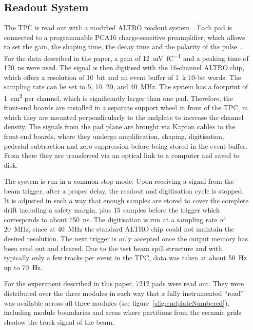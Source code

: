 \documentclass[preprint]{elsarticle}
\begin{document}
\subsection{Readout System}
The TPC is read out with a modified ALTRO readout system~\cite{ALTROchip,altro:eudet08}. Each pad is connected to a programmable PCA16 charge-sensitive preamplifier, which allows to set the gain, the shaping time, the decay time and the polarity of the pulse~\cite{EudetPCA16,ShiMaster}. For the data described in the paper, a gain of \SI[per-mode=symbol]{12}{\mV \per \femto\coulomb} and a peaking time of \SI{120}{\ns} were used. The signal is then digitised with the 16-channel ALTRO chip, which offers a resolution of 10~bit and an event buffer of \SI{1}{k} 10-bit words. The sampling rate can be set to 5, 10, 20, and \SI{40}{\MHz}. The system has a footprint of \SI{1}{\square\cm} per channel, which is significantly larger than one pad. Therefore, the front-end boards are installed in a separate support wheel in front of the TPC, in which they are mounted perpendicularly to the endplate to increase the channel density. The signals from the pad plane are brought via Kapton cables 
to the front-end boards, where 
they undergo amplification, shaping, digitisation, pedestal subtraction and zero suppression before being stored in the event buffer. From there they are transferred via an optical link to a computer and saved to disk.

The system is run in a common stop mode. Upon receiving a signal from the beam trigger, after a proper delay, the readout and digitisation cycle is stopped. It is adjusted in such a way that enough samples are stored to cover the complete drift including a safety margin, plus 15 samples before the trigger which corresponds to about \SI{750}{ns}. 
The digitisation is run at a sampling rate of \SI{20}{\MHz}, since at \SI{40}{\MHz} the standard ALTRO chip could not maintain the desired resolution. The next trigger is only accepted once the output memory has been read out and cleared. Due to the test beam spill structure and with typically only a few tracks per event in the TPC, data was taken at about \SI{50}{\Hz} up to \SI{70}{\Hz}.

For the experiment described in this paper, 7212 pads were read out. They were distributed over the three modules in such way that a fully instrumented ``road'' was available across all three modules (see figure~\ref{sfig:endplateNumbered}), including module boundaries and areas where partitions from the ceramic grids shadow the track signal of the beam. 
\end{document}
